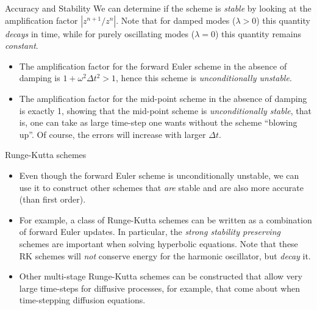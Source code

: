 \documentclass[pdf]{beamer}
\theoremstyle{definition}
\begin{document}
\begin{frame}{Accuracy and Stability}
  We can determine if the scheme is \emph{stable} by looking at the
  amplification factor $| z^{n+1}/z^n|$. Note that for damped modes
  ($\lambda>0$) this quantity \emph{decays} in time, while for purely
  oscillating modes ($\lambda = 0$) this quantity remains
  \emph{constant}.

  
  \begin{itemize}
  \item The amplification factor for the forward Euler scheme in the
    absence of damping is $1+\omega^2\Delta t^2 > 1$, hence this
    scheme is \emph{unconditionally unstable}.
  \item The amplification factor for the mid-point scheme in the
    absence of damping is exactly 1, showing that the mid-point scheme
    is \emph{unconditionally stable}, that is, one can take as large
    time-step one wants without the scheme ``blowing up''. Of course,
    the errors will increase with larger $\Delta t$.
  \end{itemize}
\end{frame}

\begin{frame}{Runge-Kutta schemes}
  \begin{itemize}
  \item Even though the forward Euler scheme is unconditionally
    unstable, we can use it to construct other schemes that \emph{are}
    stable and are also more accurate (than first order).
  \item For example, a class of Runge-Kutta schemes can be written as
    a combination of forward Euler updates. In particular, the
    \emph{strong stability preserving} schemes are important when
    solving hyperbolic equations. Note that these RK schemes will
    \emph{not} conserve energy for the harmonic oscillator, but
    \emph{decay} it.
  \item Other multi-stage Runge-Kutta schemes can be constructed that
    allow very large time-steps for diffusive processes, for example,
    that come about when time-stepping diffusion equations.
  \end{itemize}
\end{frame}
\end{document}
